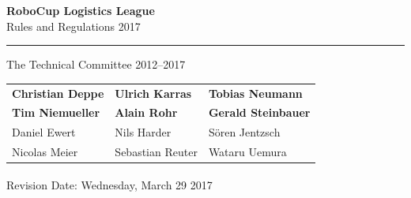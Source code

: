 \documentclass[12pt,twoside]{article}
\begin{document}
\hypersetup{pageanchor=false}


\begin{titlepage}
  \vspace*{5cm}
  \begin{center}
    \begin{LARGE}

      {\bf RoboCup Logistics League}\\[2ex]
      {\Large Rules and Regulations 2017}\\[4ex]
    \end{LARGE}
    \hrule

    {\LARGE\vspace*{4ex}}
    \begin{Large}
      The Technical Committee 2012--2017\\[6ex]
    \end{Large}
    \begin{tabular}{lll}
      \textbf{Christian Deppe}&\textbf{Ulrich Karras}&\textbf{Tobias Neumann}\\
      \textbf{Tim Niemueller}&\textbf{Alain Rohr}&\textbf{Gerald Steinbauer}\\[.5em]

      Daniel Ewert&Nils Harder&S\"oren Jentzsch\\
      Nicolas Meier&Sebastian Reuter&Wataru Uemura\\
    \end{tabular}
    \vfill
    Revision Date: Wednesday, March 29\textsuperscript{} 2017 %
  \end{center}
\end{titlepage}
\thispagestyle{empty}
\pagebreak
\clearpage

\hypersetup{pageanchor=true}
\setcounter{page}{1}
\tableofcontents
\newpage
\cleardoublepage

\setcounter{page}{1}

\end{document}

